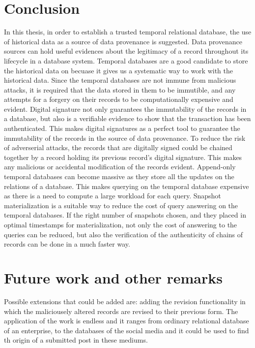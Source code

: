 	\section{Conclusion}
	In this thesis, in order to establish a trusted temporal relational database, the use of historical data as a source of data provenance is suggested. Data provenance sources can hold useful evidences about the legitimacy of a record throughout its lifecycle in a database system. Temporal databases are a good candidate to store the historical data on becuase it gives us a systematic way to work with the historical data. Since the temporal databases are not immune from malicious attacks, it is required that the data stored in them to be immutible, and any attempts for a forgery on their records to be computationally expensive and evident. Digital signature not only guarantees the immutability of the records in a database, but also is a verifiable evidence to show that the transaction has been authenticated. This makes digital signatures as a perfect tool to guarantee the immutability of the records in the source of data provenance. To reduce the risk of adverserial attacks, the records that are digitally signed could be chained together by a record holding its previous record's digital signature. This makes any malicious or accidental modification of the records evident.
	Append-only temporal databases can become massive as they store all the updates on the relations of a database. This makes querying on the temporal database expensive as there is a need to compute a large workload for each query. Snapshot materialization is a suitable way to reduce the cost of query answering on the temporal databases. If the right number of snapshots chosen, and they placed in optimal timestamps for materialization, not only the cost of answering to the queries can be reduced, but also the verification of the authenticity of chains of records can be done in a much faster way.
	\section{Future work and other remarks}
		Possible extensions that could be added are: adding the revision functionality in which the maliciousely altered records are revised to their previous form. The application of the work is endless and it ranges from ordinary relational database of an enterprise, to the databases of the social media and it could be used to find th origin of a submitted post in these mediums.